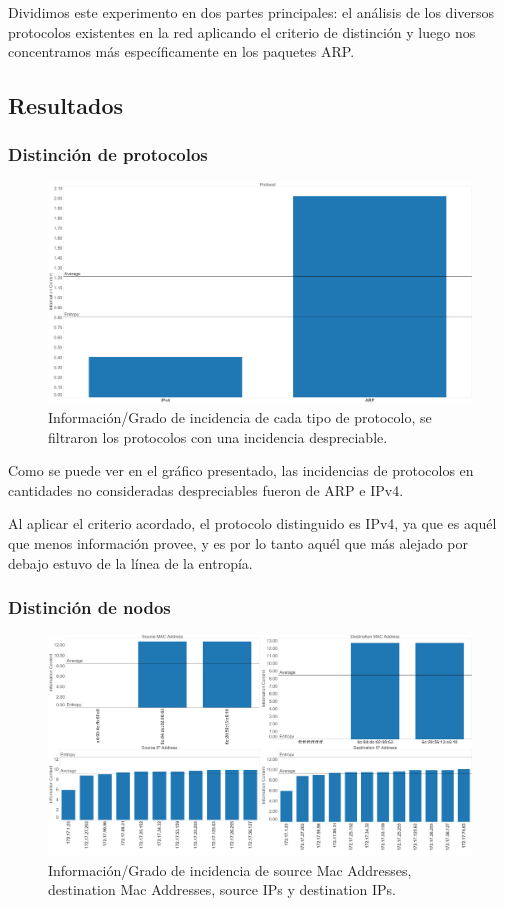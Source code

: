\documentclass{article}
\theoremstyle{definition}
\theoremstyle{remark}
\begin{document}
Dividimos este experimento en dos partes principales: el análisis de los diversos protocolos existentes en la red aplicando el criterio de distinción y luego nos concentramos más específicamente en los paquetes ARP.
\subsection{Resultados}

\subsubsection{Distinción de protocolos}

\begin{figure}[H]
\centering
\includegraphics[width=450pt]{captures/McDonalds/20min/Protocol PDF Dashboard.png}
\caption{Información/Grado de incidencia de cada tipo de protocolo, se filtraron los protocolos con una incidencia despreciable.}
\end{figure}

Como se puede ver en el gráfico presentado, las incidencias de protocolos en cantidades no consideradas despreciables fueron de ARP e IPv4. 

Al aplicar el criterio acordado, el protocolo distinguido es IPv4, ya que es aquél que menos información provee, y es por lo tanto aquél que más alejado por debajo estuvo de la línea de la entropía.

\subsubsection{Distinción de nodos}
\begin{figure}[H]
\centering
\includegraphics[width=450pt]{captures/McDonalds/20min/PDFs Dashboard.png}
\caption{Información/Grado de incidencia de source Mac Addresses, destination Mac Addresses, source IPs y destination IPs.}
\end{figure}
\end{document}
